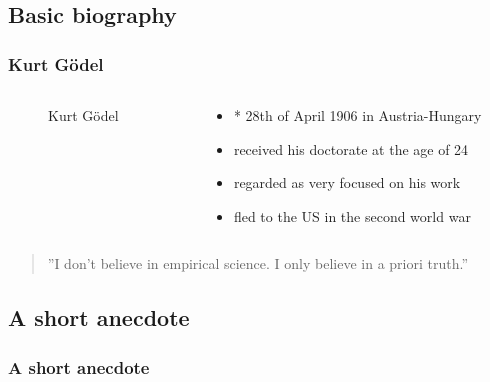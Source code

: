 \subsection{Basic biography}
\begin{frame}
    \frametitle{Kurt Gödel}
    \begin{columns}
        \begin{column}{.3\textwidth}
            \begin{figure}
                \caption*{Kurt Gödel}
            \end{figure}
        \end{column}
        \begin{column}{.8\textwidth}
            \begin{itemize}
                \item * 28th of April 1906 in Austria-Hungary
                \item received his doctorate at the age of 24
                \item regarded as very focused on his work
                \item fled to the US in the second world war
            \end{itemize}
        \end{column}
    \end{columns}
    
    \begin{quote}
        \begin{center}
           \parbox{1.2\textwidth}{
            ''I don't believe in empirical science. I only believe in a priori truth.''}
        \end{center}
    \end{quote}
\end{frame}

\subsection{A short anecdote}
\begin{frame}
    \frametitle{A short anecdote}
    \begin{figure}
    \end{figure}
\end{frame}